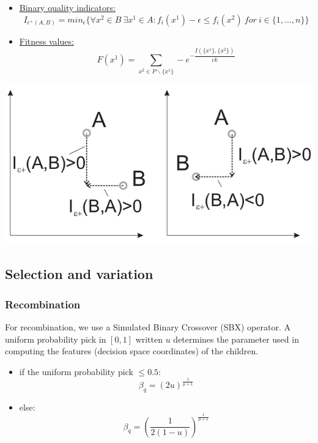 \documentclass{beamer}
\begin{document}
\begin{frame}
\begin{adjustwidth}{-2.2em}{-2.2em}
\begin{itemize}
\item \underline{Binary quality indicators:}
\begin{equation}
I_{\epsilon^+ (A,B)} = min_{\epsilon} \{\forall x^2 \in B\ \exists x^1 \in A : f_i(x^1) - \epsilon \leq f_i (x^2)\ for\ i \in \{1,...,n\}\}
\end{equation}
\item \underline{Fitness values:}
\begin{equation}
F(x^1) = \sum_{x^2 \in P \backslash \{x^1\}} -e^{-\dfrac{I(\{x^1\},\{x^2\})}{ck}}
\end{equation}
\end{itemize}
\end{adjustwidth}
\begin{center}
\includegraphics[scale=0.2]{binaryIndicators.png} \footnotemark
\end{center}
\end{frame}

\subsection{Selection and variation}
\begin{frame}
\frametitle{Recombination}
For recombination, we use a Simulated Binary Crossover (SBX) operator. A uniform probability pick in $[0,1]$ written $u$ determines the parameter used in computing the features (decision space coordinates) of the children.
\begin{itemize}
\item if the uniform probability pick $\leq 0.5$:
\begin{equation}
\beta_q = (2u)^{\frac{1}{\mu +1}}
\end{equation}
\item else:
\begin{equation}
\beta_q = (\frac{1}{2(1-u)})^{\frac{1}{\mu +1}}
\end{equation}
\end{itemize}
\end{frame}
\end{document}
